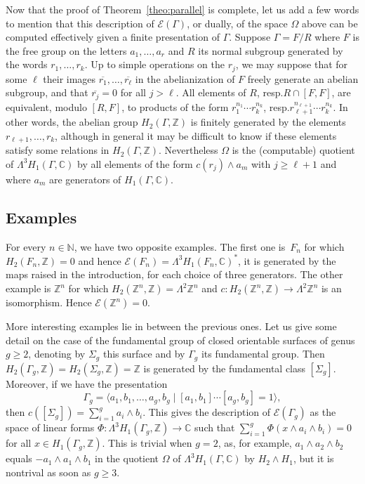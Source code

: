 \documentclass[11pt]{article}
\newcommand{\resp}{resp.\xspace}
\let\mathcal\mathscr
\theoremstyle{definition}
\newcommand{\ZZ}{\mathbb{Z}}
\newcommand{\NN}{\mathbb{N}}
\newcommand{\CC}{\mathbb{C}}
\begin{document}
Now that the proof of Theorem~\ref{theo:parallel} is complete, let us add
a few words to mention that this description of $\mathcal{E}(\Gamma)$, or
dually, of the space $\Omega$ above can be computed effectively given a
finite presentation of $\Gamma$. Suppose $\Gamma=F/R$ where $F$ is the free
group on the letters $a_1,\ldots,a_r$ and $R$ its normal subgroup generated
by the words $r_1,\ldots,r_k$. Up to simple operations on the $r_j$, we may
suppose that for some $\ell$ their images
$\overline{r_1},\ldots,\overline{r_\ell}$ in the abelianization of $F$ freely
generate an abelian subgroup, and that $\overline{r_j}=0$ for all $j>\ell$.
All elements of $R$, \resp $R\cap[F,F]$, are equivalent, modulo $[R,F]$, to
products of the form $r_1^{n_1}\cdots r_k^{n_k}$,
\resp $r_{\ell+1}^{n_{\ell+1}}\cdots r_k^{n_k}$.
In other words, the abelian group $H_2(\Gamma,\ZZ)$ is finitely generated by
the elements $r_{\ell+1},\ldots,r_k$, although in general it may be difficult
to know if these elements satisfy some relations in $H_2(\Gamma,\ZZ)$.
Nevertheless $\Omega$ is the (computable) quotient of
$\Lambda^3H_1(\Gamma,\CC)$ by all elements of the form $c(r_j)\wedge a_m$
with $j\geq\ell+1$ and where $a_m$ are generators of $H_1(\Gamma,\CC)$.

\subsection{Examples}
For every $n\in \NN$, we have two opposite examples. The first one is~$F_n$
for which $H_2(F_n,\ZZ)=0$ and hence
$\mathcal{E}(F_n)=\Lambda^3H_1(F_n,\CC)^*$, it is generated by the maps
raised in the introduction, for each choice of three generators.
The other example is $\ZZ^n$ for which $H_2(\ZZ^n,\ZZ)=\Lambda^2\ZZ^n$ and
$c\colon H_2(\ZZ^n,\ZZ)\to \Lambda^2 \ZZ^n$ is an isomorphism.
Hence $\mathcal{E}(\ZZ^n)=0$.

More interesting examples lie in between the previous ones. Let us give
some detail on the case of the fundamental group of closed orientable
surfaces of genus $g\geq 2$, denoting by $\Sigma_g$ this surface and by
$\Gamma_g$ its fundamental group.
Then $H_2(\Gamma_g,\ZZ)=H_2(\Sigma_g,\ZZ)=\ZZ$ is generated by the fundamental
class $[\Sigma_g]$. Moreover, if we have the presentation
\[ \Gamma_g=\langle a_1,b_1,\ldots,a_g,b_g \mid
[a_1,b_1]\cdots[a_g,b_g]=1\rangle, \]
then $c([\Sigma_g])=\sum_{i=1}^g a_i\wedge b_i$. This gives the description
of $\mathcal{E}(\Gamma_g)$ as the space of linear forms
$\Phi :\Lambda^3 H_1(\Gamma_g,\ZZ)\to\CC$ such that
$\sum_{i=1}^g \Phi(x\wedge a_i\wedge b_i)=0$
for all $x\in H_1(\Gamma_g,\ZZ)$. This is trivial when $g=2$, as, for
example, $a_1\wedge a_2\wedge b_2$ equals $-a_1\wedge a_1\wedge b_1$ in
the quotient $\Omega$ of $\Lambda^3H_1(\Gamma,\CC)$ by $H_2\wedge H_1$, but
it is nontrival as soon as $g\geq 3$.
\end{document}

